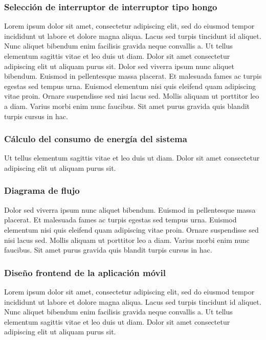 \subsubsection{Selección de interruptor de interruptor tipo hongo}

Lorem ipsum dolor sit amet, consectetur adipiscing elit, sed do eiusmod tempor incididunt ut labore et dolore magna aliqua. Lacus sed turpis tincidunt id aliquet. Nunc aliquet bibendum enim facilisis gravida neque convallis a. Ut tellus elementum sagittis vitae et leo duis ut diam. Dolor sit amet consectetur adipiscing elit ut aliquam purus sit. Dolor sed viverra ipsum nunc aliquet bibendum. Euismod in pellentesque massa placerat. Et malesuada fames ac turpis egestas sed tempus urna. Euismod elementum nisi quis eleifend quam adipiscing vitae proin. Ornare suspendisse sed nisi lacus sed. Mollis aliquam ut porttitor leo a diam. Varius morbi enim nunc faucibus. Sit amet purus gravida quis blandit turpis cursus in hac.

\subsubsection{Cálculo del consumo de energía del sistema} 

Ut tellus elementum sagittis vitae et leo duis ut diam. Dolor sit amet consectetur adipiscing elit ut aliquam purus sit.


\subsubsection{Diagrama de flujo}

Dolor sed viverra ipsum nunc aliquet bibendum. Euismod in pellentesque massa placerat. Et malesuada fames ac turpis egestas sed tempus urna. Euismod elementum nisi quis eleifend quam adipiscing vitae proin. Ornare suspendisse sed nisi lacus sed. Mollis aliquam ut porttitor leo a diam. Varius morbi enim nunc faucibus. Sit amet purus gravida quis blandit turpis cursus in hac.

\subsubsection{Diseño frontend de la aplicación móvil}

Lorem ipsum dolor sit amet, consectetur adipiscing elit, sed do eiusmod tempor incididunt ut labore et dolore magna aliqua. Lacus sed turpis tincidunt id aliquet. Nunc aliquet bibendum enim facilisis gravida neque convallis a. Ut tellus elementum sagittis vitae et leo duis ut diam. Dolor sit amet consectetur adipiscing elit ut aliquam purus sit. 


